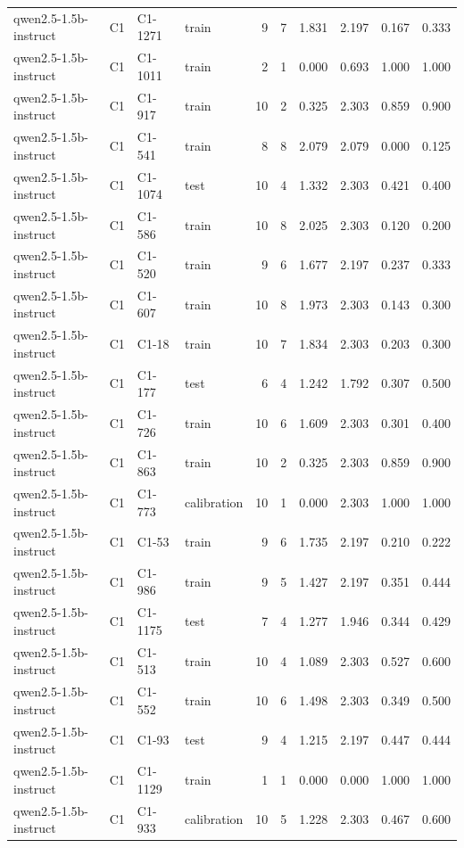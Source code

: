 \begin{table}
\begin{tabular}{llllrrrrrr}
qwen2.5-1.5b-instruct & C1 & C1-1271 & train & 9 & 7 & 1.831 & 2.197 & 0.167 & 0.333 \\
qwen2.5-1.5b-instruct & C1 & C1-1011 & train & 2 & 1 & 0.000 & 0.693 & 1.000 & 1.000 \\
qwen2.5-1.5b-instruct & C1 & C1-917 & train & 10 & 2 & 0.325 & 2.303 & 0.859 & 0.900 \\
qwen2.5-1.5b-instruct & C1 & C1-541 & train & 8 & 8 & 2.079 & 2.079 & 0.000 & 0.125 \\
qwen2.5-1.5b-instruct & C1 & C1-1074 & test & 10 & 4 & 1.332 & 2.303 & 0.421 & 0.400 \\
qwen2.5-1.5b-instruct & C1 & C1-586 & train & 10 & 8 & 2.025 & 2.303 & 0.120 & 0.200 \\
qwen2.5-1.5b-instruct & C1 & C1-520 & train & 9 & 6 & 1.677 & 2.197 & 0.237 & 0.333 \\
qwen2.5-1.5b-instruct & C1 & C1-607 & train & 10 & 8 & 1.973 & 2.303 & 0.143 & 0.300 \\
qwen2.5-1.5b-instruct & C1 & C1-18 & train & 10 & 7 & 1.834 & 2.303 & 0.203 & 0.300 \\
qwen2.5-1.5b-instruct & C1 & C1-177 & test & 6 & 4 & 1.242 & 1.792 & 0.307 & 0.500 \\
qwen2.5-1.5b-instruct & C1 & C1-726 & train & 10 & 6 & 1.609 & 2.303 & 0.301 & 0.400 \\
qwen2.5-1.5b-instruct & C1 & C1-863 & train & 10 & 2 & 0.325 & 2.303 & 0.859 & 0.900 \\
qwen2.5-1.5b-instruct & C1 & C1-773 & calibration & 10 & 1 & 0.000 & 2.303 & 1.000 & 1.000 \\
qwen2.5-1.5b-instruct & C1 & C1-53 & train & 9 & 6 & 1.735 & 2.197 & 0.210 & 0.222 \\
qwen2.5-1.5b-instruct & C1 & C1-986 & train & 9 & 5 & 1.427 & 2.197 & 0.351 & 0.444 \\
qwen2.5-1.5b-instruct & C1 & C1-1175 & test & 7 & 4 & 1.277 & 1.946 & 0.344 & 0.429 \\
qwen2.5-1.5b-instruct & C1 & C1-513 & train & 10 & 4 & 1.089 & 2.303 & 0.527 & 0.600 \\
qwen2.5-1.5b-instruct & C1 & C1-552 & train & 10 & 6 & 1.498 & 2.303 & 0.349 & 0.500 \\
qwen2.5-1.5b-instruct & C1 & C1-93 & test & 9 & 4 & 1.215 & 2.197 & 0.447 & 0.444 \\
qwen2.5-1.5b-instruct & C1 & C1-1129 & train & 1 & 1 & 0.000 & 0.000 & 1.000 & 1.000 \\
qwen2.5-1.5b-instruct & C1 & C1-933 & calibration & 10 & 5 & 1.228 & 2.303 & 0.467 & 0.600 \\

\end{tabular}
\end{table}
